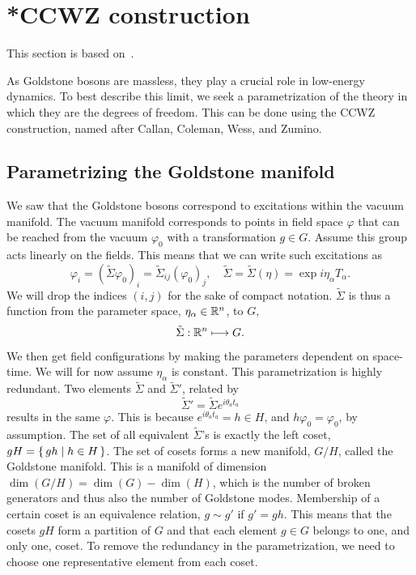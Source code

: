 \section{*CCWZ construction}
\label{seciton: ccwz construction}

This section is based on~\autocite{callanStructurePhenomenologicalLagrangians1969,colemanStructurePhenomenologicalLagrangians1969,morrisonColemanCallanWessZuminoConstruction2017,panicoCompositeNambuGoldstoneHiggs2016,weinbergQuantumTheoryFields1996,pichEffectiveFieldTheory2020}.

As Goldstone bosons are massless, they play a crucial role in low-energy dynamics.
To best describe this limit, we seek a parametrization of the theory in which they are the degrees of freedom.
This can be done using the CCWZ construction, named after Callan, Coleman, Wess, and Zumino.





\subsection{Parametrizing the Goldstone manifold}

We saw that the Goldstone bosons correspond to excitations within the vacuum manifold.
The vacuum manifold corresponds to points in field space $\varphi$ that can be reached from the vacuum $\varphi_0$ with a transformation $g \in G$.
Assume this group acts linearly on the fields.
This means that we can write such excitations as
%
\begin{equation}
    \varphi_i = (\tilde\Sigma \varphi_0)_{i} = \tilde \Sigma_{ij} (\varphi_0)_j, 
    \quad \tilde \Sigma = \tilde \Sigma(\eta) = \exp{i \eta_\alpha T_\alpha}.
\end{equation}
%
We will drop the indices $(i, j)$ for the sake of compact notation.
$\tilde \Sigma$ is thus a function from the parameter space, $\eta_\alpha \in \mathbb{R}^n$, to $G$,
\begin{align}
    \tilde \Sigma: \mathbb{R}^n \longmapsto G.
\end{align}
%
We then get field configurations by making the parameters dependent on space-time.
We will for now assume $\eta_\alpha$ is constant.
This parametrization is highly redundant.
Two elements $\tilde\Sigma$ and $\tilde\Sigma'$, related by
%
\begin{equation}
    \tilde \Sigma' = \tilde\Sigma e^{i \theta_a t_a}
\end{equation}
%
results in the same $\varphi$.
This is because  $e^{i \theta_a t_a} = h \in H$, and $h \varphi_0 = \varphi_0$, by assumption.
The set of all equivalent $\tilde \Sigma$'s is exactly the left coset, $gH = \left\{\, gh \mid  h \in H \,\right\}$.
The set of cosets forms a new manifold, $G / H$, called the Goldstone manifold.
This is a manifold of dimension $\dim(G/H) = \dim(G) - \dim(H)$, which is the number of broken generators and thus also the number of Goldstone modes.
Membership of a certain coset is an equivalence relation, $g \sim g'$ if $g' = gh$.
This means that the cosets $gH$ form a partition of $G$ and that each element $g \in G$ belongs to one, and only one, coset.
To remove the redundancy in the parametrization, we need to choose one representative element from each coset.


